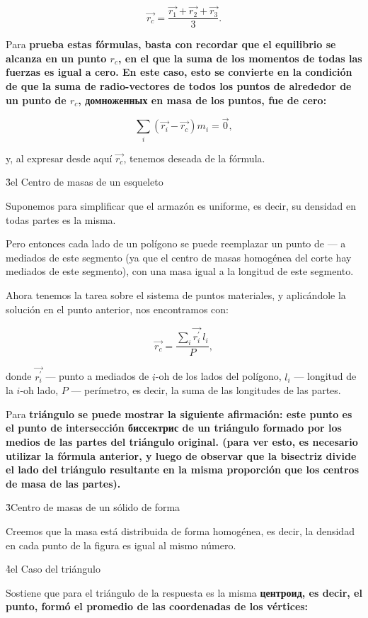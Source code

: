 $$ \vec{r_c} = \frac{ \vec{r_1} + \vec{r_2} + \vec{r_3} }{ 3 }. $$

Para \bf{prueba} estas fórmulas, basta con recordar que el equilibrio se alcanza en un punto $r_c$, en el que la suma de los momentos de todas las fuerzas es igual a cero. En este caso, esto se convierte en la condición de que la suma de radio-vectores de todos los puntos de alrededor de un punto de $r_c$, домноженных en masa de los puntos, fue de cero:

$$ \sum\limits_i \left( \vec{r_i} - \vec{r_c} \right) m_i = \vec{0}, $$

y, al expresar desde aquí $\vec{r_c}$, tenemos deseada de la fórmula.


\h3{el Centro de masas de un esqueleto}

Suponemos para simplificar que el armazón es uniforme, es decir, su densidad en todas partes es la misma.

Pero entonces cada lado de un polígono se puede reemplazar un punto de --- a mediados de este segmento (ya que el centro de masas homogénea del corte hay mediados de este segmento), con una masa igual a la longitud de este segmento.

Ahora tenemos la tarea sobre el sistema de puntos materiales, y aplicándole la solución en el punto anterior, nos encontramos con:

$$ \vec{r_c} = \frac{ \sum\limits_i \vec{r_i^\prime} ~ l_i }{ P }, $$

donde $\vec{r_i^\prime}$ --- punto a mediados de $i$-oh de los lados del polígono, $l_i$ --- longitud de la $i$-oh lado, $P$ --- perímetro, es decir, la suma de las longitudes de las partes.

Para \bf{triángulo} se puede mostrar la siguiente afirmación: este punto es \bf{el punto de intersección биссектрис} de un triángulo formado por los medios de las partes del triángulo original. (para ver esto, es necesario utilizar la fórmula anterior, y luego de observar que la bisectriz divide el lado del triángulo resultante en la misma proporción que los centros de masa de las partes).


\h3{Centro de masas de un sólido de forma}

Creemos que la masa está distribuida de forma homogénea, es decir, la densidad en cada punto de la figura es igual al mismo número.

\h4{el Caso del triángulo}

Sostiene que para el triángulo de la respuesta es la misma \bf{центроид}, es decir, el punto, formó el promedio de las coordenadas de los vértices:

